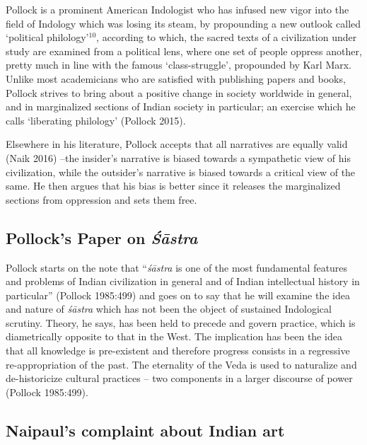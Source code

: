Pollock is a prominent American Indologist who has infused new vigor into the ﬁeld of Indology which was losing its steam, by propounding a new outlook called `political philology'$^{10}$, according to which, the sacred texts of a civilization under study are examined from a political lens, where one set of people oppress another, pretty much in line with the famous `class-struggle', propounded by Karl Marx. Unlike most academicians who are satisﬁed with publishing papers and books, Pollock strives to bring about a positive change in society worldwide in general, and in marginalized sections of Indian society in particular; an exercise which he calls `liberating philology' (Pollock 2015).

Elsewhere in his literature, Pollock accepts that all narratives are equally valid (Naik 2016) --the insider's narrative is biased towards a sympathetic view of his civilization, while the outsider's narrative is biased towards a critical view of the same. He then argues that his bias is better since it releases the marginalized sections from oppression and sets them free.

\subsection{Pollock's Paper on {{\sl\bfseries Śāstra}\relax}}\label{art12-sec3.1}

Pollock starts on the note that ``{\sl śāstra} is one of the most fundamental features and problems of Indian civilization in general and of Indian intellectual history in particular'' (Pollock 1985:499) and goes on to say that he will examine the idea and nature of {\sl śāstra} which has not been the object of sustained Indological scrutiny. Theory, he says, has been held to precede and govern practice, which is diametrically opposite to that in the West. The implication has been the idea that all knowledge is pre-existent and therefore progress consists in a regressive re-appropriation of the past. The eternality of the Veda is used to naturalize and de-historicize cultural practices -- two components in a larger discourse of power (Pollock 1985:499).

\subsection{Naipaul's complaint about Indian art}\label{art12-sec3.2}

